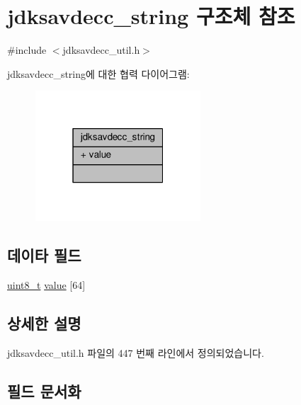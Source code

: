 \hypertarget{structjdksavdecc__string}{}\section{jdksavdecc\+\_\+string 구조체 참조}
\label{structjdksavdecc__string}


{\ttfamily \#include $<$jdksavdecc\+\_\+util.\+h$>$}



jdksavdecc\+\_\+string에 대한 협력 다이어그램\+:
\nopagebreak
\begin{figure}[H]
\begin{center}
\leavevmode
\includegraphics[width=175pt]{structjdksavdecc__string__coll__graph}
\end{center}
\end{figure}
\subsection*{데이타 필드}
\begin{DoxyCompactItemize}
\item 
\hyperlink{stdint_8h_aba7bc1797add20fe3efdf37ced1182c5}{uint8\+\_\+t} \hyperlink{structjdksavdecc__string_a7968db9d35aabae83b5c038723160e28}{value} \mbox{[}64\mbox{]}
\end{DoxyCompactItemize}


\subsection{상세한 설명}


jdksavdecc\+\_\+util.\+h 파일의 447 번째 라인에서 정의되었습니다.



\subsection{필드 문서화}
